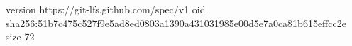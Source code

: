 version https://git-lfs.github.com/spec/v1
oid sha256:51b7c475c527f9e5ad8ed0803a1390a431031985e00d5e7a0ca81b615effcc2e
size 72
